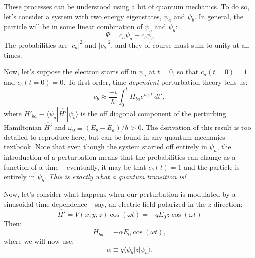 \documentclass{article}
\begin{document}
These processes can be understood using a bit of quantum mechanics. To do so, let's consider a system with two energy eigenstates, $\psi_a$ and $\psi_b$. In general, the particle will be in some linear combination of $\psi_a$ and $\psi_b$:
\begin{equation}
\Psi = c_a\psi_a + c_b\psi_b
\end{equation}
The probabilities are $|c_a|^2$ and $|c_b|^2$, and they of course must sum to unity at all times.

Now, let's suppose the electron starts off in $\psi_a$ at $t=0$, so that $c_a(t=0) = 1$ and $c_b(t=0) = 0$. To first-order, time \textit{dependent} perturbation theory tells us:
\begin{equation}
c_b \approx \frac{-i}{\hbar}\int_0^t H_{ba}e^{i\omega_0t'}dt',
\end{equation}
where $H'_{ba} \equiv \langle \psi_a | \hat{H'} | \psi_b \rangle$ is the off diagonal component of the perturbing Hamiltonian $\hat{H'}$ and $\omega_0 \equiv (E_b - E_a)/\hbar > 0$. The derivation of this result is too detailed to reproduce here, but can be found in any quantum mechanics textbook. Note that even though the system started off entirely in $\psi_a$, the introduction of a perturbation means that the probabilities can change as a function of a time -- eventually, it may be that $c_b(t) = 1$ and the particle is entirely in $\psi_b$. \textit{This is exactly what a quantum transition is!}

Now, let's consider what happens when our perturbation is modulated by a sinusoidal time dependence -- say, an electric field polarized in the $z$ direction:
\begin{equation}
\hat{H'} = V(x,y,z)\cos(\omega t) = -qE_0z\cos(\omega t)
\end{equation}
Then: 
\begin{equation}
H_{ba} = -\alpha E_0 \cos(\omega t), 
\end{equation}
where we will now use:
\begin{equation}
\alpha \equiv q \langle \psi_b | z | \psi_a \rangle.
\end{equation}
\end{document}
